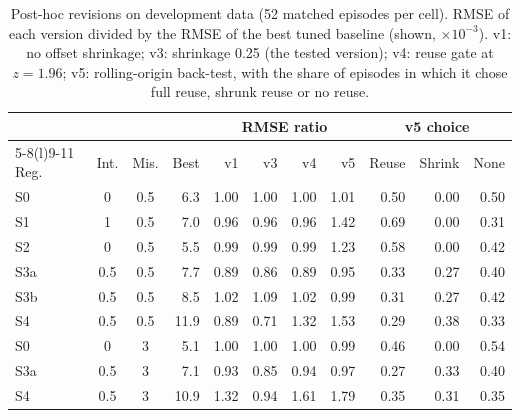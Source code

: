 \begin{table}[t]\centering\scriptsize
\caption{Post-hoc revisions on development data (52 matched episodes per cell). RMSE of each version divided by the RMSE of the best tuned baseline (shown, $\times10^{-3}$). v1: no offset shrinkage; v3: shrinkage 0.25 (the tested version); v4: reuse gate at $z=1.96$; v5: rolling-origin back-test, with the share of episodes in which it chose full reuse, shrunk reuse or no reuse.}
\label{tab:revisions}
\begin{tabular}{@{}lccrrrrrrrr@{}}\toprule
 & & & & \multicolumn{4}{c}{RMSE ratio} & \multicolumn{3}{c}{v5 choice} \\\cmidrule(lr){5-8}\cmidrule(l){9-11}
Reg. & Int. & Mis. & Best & v1 & v3 & v4 & v5 & Reuse & Shrink & None \\\midrule
S0 & 0 & 0.5 & 6.3 & 1.00 & 1.00 & 1.00 & 1.01 & 0.50 & 0.00 & 0.50 \\
S1 & 1 & 0.5 & 7.0 & 0.96 & 0.96 & 0.96 & 1.42 & 0.69 & 0.00 & 0.31 \\
S2 & 0 & 0.5 & 5.5 & 0.99 & 0.99 & 0.99 & 1.23 & 0.58 & 0.00 & 0.42 \\
S3a & 0.5 & 0.5 & 7.7 & 0.89 & 0.86 & 0.89 & 0.95 & 0.33 & 0.27 & 0.40 \\
S3b & 0.5 & 0.5 & 8.5 & 1.02 & 1.09 & 1.02 & 0.99 & 0.31 & 0.27 & 0.42 \\
S4 & 0.5 & 0.5 & 11.9 & 0.89 & 0.71 & 1.32 & 1.53 & 0.29 & 0.38 & 0.33 \\
S0 & 0 & 3 & 5.1 & 1.00 & 1.00 & 1.00 & 0.99 & 0.46 & 0.00 & 0.54 \\
S3a & 0.5 & 3 & 7.1 & 0.93 & 0.85 & 0.94 & 0.97 & 0.27 & 0.33 & 0.40 \\
S4 & 0.5 & 3 & 10.9 & 1.32 & 0.94 & 1.61 & 1.79 & 0.35 & 0.31 & 0.35 \\
\bottomrule\end{tabular}\end{table}
